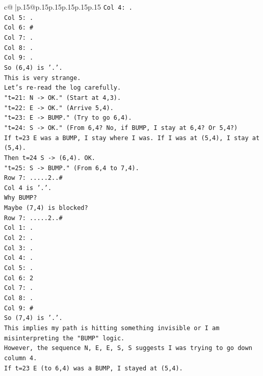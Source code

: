 \documentclass{article}
\begin{document}
{\begin{supertabular}{c@{$\;$}|p{.15\linewidth}@{}p{.15\linewidth}p{.15\linewidth}p{.15\linewidth}p{.15\linewidth}p{.15\linewidth}}
{{{\texttt{Col 4: .} \\
\texttt{Col 5: .} \\
\texttt{Col 6: \#} \\
\texttt{Col 7: .} \\
\texttt{Col 8: .} \\
\texttt{Col 9: .} \\
\texttt{So (6,4) is '.'.} \\
\texttt{This is very strange.} \\
\texttt{Let's re{-}read the log carefully.} \\
\texttt{"t=21: N {-}> OK." (Start at 4,3).} \\
\texttt{"t=22: E {-}> OK." (Arrive 5,4).} \\
\texttt{"t=23: E {-}> BUMP." (Try to go 6,4).} \\
\texttt{"t=24: S {-}> OK." (From 6,4? No, if BUMP, I stay at 6,4? Or 5,4?)} \\
\texttt{If t=23 E was a BUMP, I stay where I was. If I was at (5,4), I stay at (5,4).} \\
\texttt{Then t=24 S {-}> (6,4). OK.} \\
\texttt{"t=25: S {-}> BUMP." (From 6,4 to 7,4).} \\
\texttt{Row 7: .....2..\#} \\
\texttt{Col 4 is '.'.} \\
\texttt{Why BUMP?} \\
\texttt{Maybe (7,4) is blocked?} \\
\texttt{Row 7: .....2..\#} \\
\texttt{Col 1: .} \\
\texttt{Col 2: .} \\
\texttt{Col 3: .} \\
\texttt{Col 4: .} \\
\texttt{Col 5: .} \\
\texttt{Col 6: 2} \\
\texttt{Col 7: .} \\
\texttt{Col 8: .} \\
\texttt{Col 9: \#} \\
\texttt{So (7,4) is '.'.} \\
\texttt{This implies my path is hitting something invisible or I am misinterpreting the "BUMP" logic.} \\
\texttt{However, the sequence N, E, E, S, S suggests I was trying to go down column 4.} \\
\texttt{If t=23 E (to 6,4) was a BUMP, I stayed at (5,4).} \\
}}}
\end{supertabular}}
\end{document}
